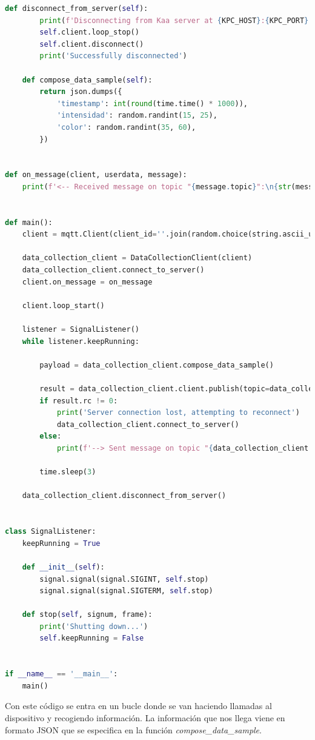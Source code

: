 {\begin{lstlisting}[language=Python]
    def disconnect_from_server(self):
        print(f'Disconnecting from Kaa server at {KPC_HOST}:{KPC_PORT}...')
        self.client.loop_stop()
        self.client.disconnect()
        print('Successfully disconnected')

    def compose_data_sample(self):
        return json.dumps({
            'timestamp': int(round(time.time() * 1000)),
            'intensidad': random.randint(15, 25),
            'color': random.randint(35, 60),
        })


def on_message(client, userdata, message):
    print(f'<-- Received message on topic "{message.topic}":\n{str(message.payload.decode("utf-8"))}')


def main():
    client = mqtt.Client(client_id=''.join(random.choice(string.ascii_uppercase + string.digits) for _ in range(6)))

    data_collection_client = DataCollectionClient(client)
    data_collection_client.connect_to_server()
    client.on_message = on_message

    client.loop_start()

    listener = SignalListener()
    while listener.keepRunning:

        payload = data_collection_client.compose_data_sample()

        result = data_collection_client.client.publish(topic=data_collection_client.data_collection_topic, payload=payload)
        if result.rc != 0:
            print('Server connection lost, attempting to reconnect')
            data_collection_client.connect_to_server()
        else:
            print(f'--> Sent message on topic "{data_collection_client.data_collection_topic}":\n{payload}')

        time.sleep(3)

    data_collection_client.disconnect_from_server()


class SignalListener:
    keepRunning = True

    def __init__(self):
        signal.signal(signal.SIGINT, self.stop)
        signal.signal(signal.SIGTERM, self.stop)

    def stop(self, signum, frame):
        print('Shutting down...')
        self.keepRunning = False


if __name__ == '__main__':
    main()
\end{lstlisting}

Con este código se entra en un bucle donde se van haciendo llamadas al dispositivo y recogiendo información. La información que nos llega viene en formato JSON que se especifica en la función \textit{compose\_data\_sample}.


}
